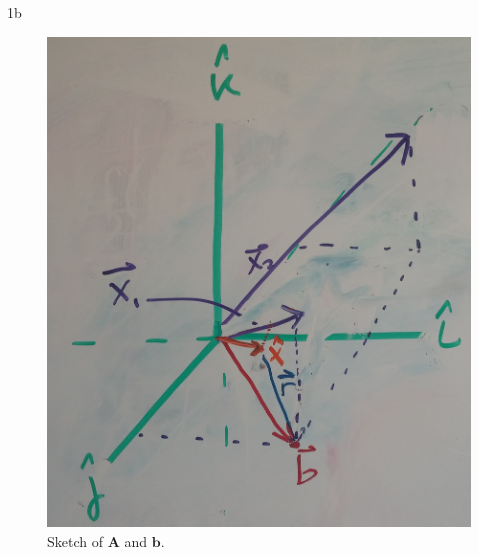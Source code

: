 \documentclass{article}
\begin{document}
\begin{homeworkProblem}
\begin{homeworkSection}{1b}
\begin{figure}[!ht]
\begin{centering}
            \includegraphics[scale=0.08]{problem1b_fig.png}

            \caption{\label{fig:1b} Sketch of $\bm{A}$ and $\bm{b}$.}

            \end{centering}
        \end{figure}

    \end{homeworkSection}

\end{homeworkProblem}
\end{document}
